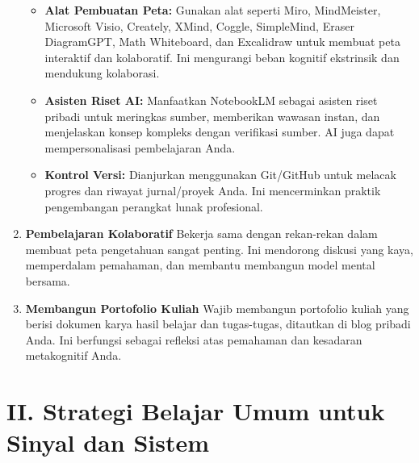 \documentclass[
  letterpaper,
  DIV=11,
  numbers=noendperiod]{scrreprt}
\providecommand{\tightlist}{%
  \setlength{\itemsep}{0pt}\setlength{\parskip}{0pt}}
\begin{document}
\begin{enumerate}
  \begin{itemize}
  \tightlist
  \item
    \textbf{Alat Pembuatan Peta:} Gunakan alat seperti Miro,
    MindMeister, Microsoft Visio, Creately, XMind, Coggle, SimpleMind,
    Eraser DiagramGPT, Math Whiteboard, dan Excalidraw untuk membuat
    peta interaktif dan kolaboratif. Ini mengurangi beban kognitif
    ekstrinsik dan mendukung kolaborasi.
  \item
    \textbf{Asisten Riset AI:} Manfaatkan NotebookLM sebagai asisten
    riset pribadi untuk meringkas sumber, memberikan wawasan instan, dan
    menjelaskan konsep kompleks dengan verifikasi sumber. AI juga dapat
    mempersonalisasi pembelajaran Anda.
  \item
    \textbf{Kontrol Versi:} Dianjurkan menggunakan Git/GitHub untuk
    melacak progres dan riwayat jurnal/proyek Anda. Ini mencerminkan
    praktik pengembangan perangkat lunak profesional.
  \end{itemize}
\item
  \textbf{Pembelajaran Kolaboratif} Bekerja sama dengan rekan-rekan
  dalam membuat peta pengetahuan sangat penting. Ini mendorong diskusi
  yang kaya, memperdalam pemahaman, dan membantu membangun model mental
  bersama.
\item
  \textbf{Membangun Portofolio Kuliah} Wajib membangun portofolio kuliah
  yang berisi dokumen karya hasil belajar dan tugas-tugas, ditautkan di
  blog pribadi Anda. Ini berfungsi sebagai refleksi atas pemahaman dan
  kesadaran metakognitif Anda.
\end{enumerate}

\section*{\texorpdfstring{\textbf{II. Strategi Belajar Umum untuk Sinyal
dan
Sistem}}{II. Strategi Belajar Umum untuk Sinyal dan Sistem}}\label{ii.-strategi-belajar-umum-untuk-sinyal-dan-sistem}

\end{document}
